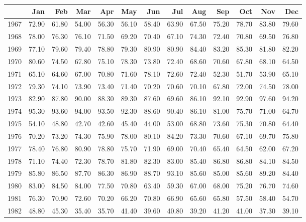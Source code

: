 \begin{longtable}{rrrrrrrrrrrrr}
  \hline
 & Jan & Feb & Mar & Apr & May & Jun & Jul & Aug & Sep & Oct & Nov & Dec \\ 
  \hline
1967 & 72.90 & 61.80 & 54.00 & 56.30 & 56.10 & 58.40 & 63.90 & 67.50 & 75.20 & 78.70 & 83.80 & 79.60 \\ 
  1968 & 78.00 & 76.30 & 76.10 & 71.50 & 69.20 & 70.40 & 67.10 & 74.30 & 72.40 & 70.80 & 69.50 & 76.80 \\ 
  1969 & 77.10 & 79.60 & 79.40 & 78.80 & 79.30 & 80.90 & 80.90 & 84.40 & 83.20 & 85.30 & 81.80 & 82.20 \\ 
  1970 & 80.60 & 74.50 & 67.80 & 75.10 & 78.30 & 73.80 & 72.40 & 68.60 & 70.60 & 67.80 & 68.10 & 64.50 \\ 
  1971 & 65.10 & 64.60 & 67.00 & 70.80 & 71.60 & 78.10 & 72.60 & 72.40 & 52.30 & 51.70 & 53.90 & 65.10 \\ 
  1972 & 79.30 & 74.10 & 73.90 & 73.40 & 71.40 & 70.20 & 70.60 & 70.10 & 67.80 & 72.00 & 74.50 & 78.00 \\ 
  1973 & 82.90 & 87.80 & 90.00 & 88.30 & 89.30 & 87.60 & 69.60 & 86.10 & 92.10 & 92.90 & 97.60 & 94.20 \\ 
  1974 & 95.30 & 93.60 & 94.00 & 93.50 & 92.30 & 88.60 & 90.40 & 86.10 & 81.00 & 75.70 & 71.00 & 64.70 \\ 
  1975 & 54.10 & 48.80 & 42.70 & 42.60 & 45.40 & 44.00 & 53.00 & 68.80 & 73.60 & 75.30 & 70.80 & 64.40 \\ 
  1976 & 70.20 & 73.20 & 74.30 & 75.90 & 78.00 & 80.10 & 84.20 & 73.30 & 70.60 & 67.10 & 69.70 & 75.80 \\ 
  1977 & 78.40 & 76.80 & 80.90 & 78.80 & 75.70 & 71.90 & 69.00 & 70.40 & 65.40 & 64.50 & 62.00 & 67.20 \\ 
  1978 & 71.10 & 74.40 & 72.30 & 78.70 & 81.80 & 82.30 & 83.00 & 85.40 & 86.80 & 86.80 & 84.10 & 84.50 \\ 
  1979 & 85.80 & 86.50 & 87.70 & 86.30 & 86.90 & 88.70 & 93.10 & 85.60 & 85.00 & 85.60 & 89.20 & 84.40 \\ 
  1980 & 83.00 & 84.50 & 84.00 & 77.50 & 70.80 & 63.40 & 59.30 & 67.00 & 68.00 & 75.20 & 76.70 & 74.60 \\ 
  1981 & 76.30 & 70.90 & 72.60 & 70.20 & 66.20 & 70.80 & 66.90 & 65.60 & 65.80 & 57.50 & 58.40 & 54.70 \\ 
  1982 & 48.80 & 45.30 & 35.40 & 35.70 & 41.40 & 39.60 & 40.80 & 39.20 & 41.20 & 41.00 & 37.30 & 39.10 \\ 

\end{longtable}
